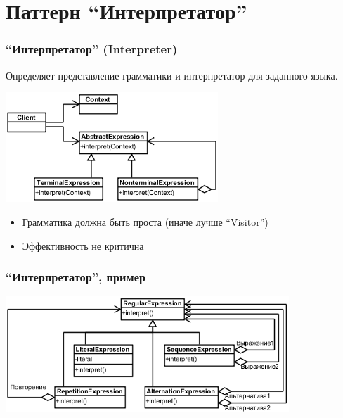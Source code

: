 \documentclass[xetex,mathserif,serif]{beamer}
\begin{document}
    \section{Паттерн ``Интерпретатор''}

    \begin{frame}
        \frametitle{``Интерпретатор'' (Interpreter)}
        Определяет представление грамматики и интерпретатор для заданного языка.
        \begin{center}
            \includegraphics[width=0.6\textwidth]{interpreter.png}
        \end{center}
        \begin{itemize}
            \item Грамматика должна быть проста (иначе лучше ``Visitor'')
            \item Эффективность не критична
        \end{itemize}
    \end{frame}

    \begin{frame}
        \frametitle{``Интерпретатор'', пример}
        \begin{center}
            \includegraphics[width=0.8\textwidth]{regexp.png}
        \end{center}
    \end{frame}
\end{document}

